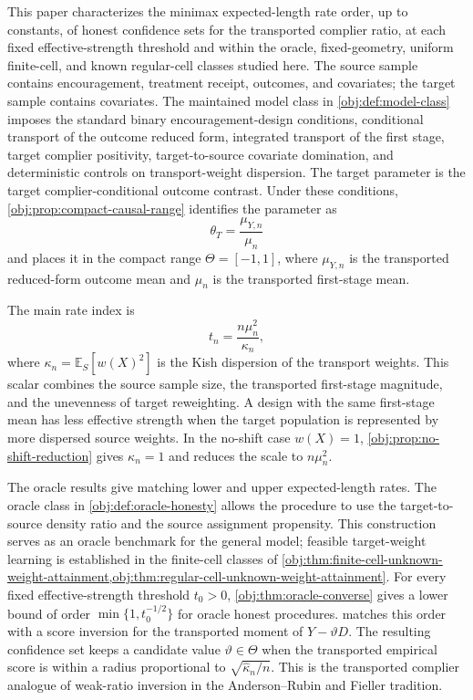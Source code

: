 This paper characterizes the minimax expected-length rate order, up to constants, of honest confidence sets for the transported complier ratio, at each fixed effective-strength threshold and within the oracle, fixed-geometry, uniform finite-cell, and known regular-cell classes studied here. The source sample contains encouragement, treatment receipt, outcomes, and covariates; the target sample contains covariates. The maintained model class in \cref{obj:def:model-class} imposes the standard binary encouragement-design conditions, conditional transport of the outcome reduced form, integrated transport of the first stage, target complier positivity, target-to-source covariate domination, and deterministic controls on transport-weight dispersion. The target parameter is the target complier-conditional outcome contrast. Under these conditions, \cref{obj:prop:compact-causal-range} identifies the parameter as
\[
\theta_T=\frac{\mu_{Y,n}}{\mu_n}
\]
and places it in the compact range \(\Theta=[-1,1]\), where \(\mu_{Y,n}\) is the transported reduced-form outcome mean and \(\mu_n\) is the transported first-stage mean.

The main rate index is
\[
t_n=\frac{n\mu_n^2}{\kappa_n},
\]
where \(\kappa_n=\mathbb E_S[w(X)^2]\) is the Kish dispersion of the transport weights. This scalar combines the source sample size, the transported first-stage magnitude, and the unevenness of target reweighting. A design with the same first-stage mean has less effective strength when the target population is represented by more dispersed source weights. In the no-shift case \(w(X)=1\), \cref{obj:prop:no-shift-reduction} gives \(\kappa_n=1\) and reduces the scale to \(n\mu_n^2\).

The oracle results give matching lower and upper expected-length rates. The oracle class in \cref{obj:def:oracle-honesty} allows the procedure to use the target-to-source density ratio and the source assignment propensity. This construction serves as an oracle benchmark for the general model; feasible target-weight learning is established in the finite-cell classes of \cref{obj:thm:finite-cell-unknown-weight-attainment,obj:thm:regular-cell-unknown-weight-attainment}. For every fixed effective-strength threshold \(t_0>0\), \cref{obj:thm:oracle-converse} gives a lower bound of order \(\min\{1,t_0^{-1/2}\}\) for oracle honest procedures.  matches this order with a score inversion for the transported moment of \(Y-\vartheta D\). The resulting confidence set keeps a candidate value \(\vartheta\in\Theta\) when the transported empirical score is within a radius proportional to \(\sqrt{\widehat\kappa_n/n}\). This is the transported complier analogue of weak-ratio inversion in the Anderson--Rubin and Fieller tradition.

